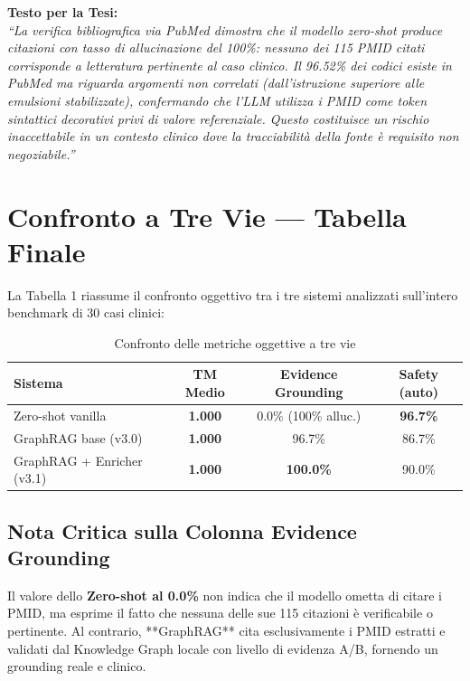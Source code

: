 \documentclass[12pt, a4paper]{article}
\begin{document}
\begin{insightbox}
\textbf{Testo per la Tesi:}
\\
\textit{``La verifica bibliografica via PubMed dimostra che il modello zero-shot produce citazioni con tasso di allucinazione del 100\%: nessuno dei 115 PMID citati corrisponde a letteratura pertinente al caso clinico. Il 96.52\% dei codici esiste in PubMed ma riguarda argomenti non correlati (dall'istruzione superiore alle emulsioni stabilizzate), confermando che l'LLM utilizza i PMID come token sintattici decorativi privi di valore referenziale. Questo costituisce un rischio inaccettabile in un contesto clinico dove la tracciabilità della fonte è requisito non negoziabile.''}
\end{insightbox}

\section{Confronto a Tre Vie --- Tabella Finale}

La Tabella 1 riassume il confronto oggettivo tra i tre sistemi analizzati sull'intero benchmark di 30 casi clinici:

\begin{table}[ht]
\centering\renewcommand{\arraystretch}{1.3}
\caption{Confronto delle metriche oggettive a tre vie}
\begin{tabular}{lccc}
\toprule
\rowcolor{primaryblue}
\color{white}\textbf{Sistema} & \color{white}\textbf{TM Medio} & \color{white}\textbf{Evidence Grounding} & \color{white}\textbf{Safety (auto)} \\
\midrule
Zero-shot vanilla & \textbf{1.000} & 0.0\% (100\% alluc.) & \textbf{96.7\%} \\
\rowcolor{roweven}
GraphRAG base (v3.0) & \textbf{1.000} & 96.7\% & 86.7\% \\
GraphRAG + Enricher (v3.1) & \textbf{1.000} & \textbf{100.0\%} & 90.0\% \\
\bottomrule
\end{tabular}
\end{table}

\subsection{Nota Critica sulla Colonna Evidence Grounding}
Il valore dello \textbf{Zero-shot al 0.0\%} non indica che il modello ometta di citare i PMID, ma esprime il fatto che nessuna delle sue 115 citazioni è verificabile o pertinente. Al contrario, **GraphRAG** cita esclusivamente i PMID estratti e validati dal Knowledge Graph locale con livello di evidenza A/B, fornendo un grounding reale e clinico.
\end{document}
